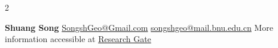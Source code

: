 \documentclass[lighthipster]{simplehipstercv}
\newlength{\rightcolwidth}
\begin{document}
\begin{paracol}{2}





\bigskip
\vfill{} %

\setlength{\parindent}{0pt}
\begin{minipage}[t]{\rightcolwidth}
\begin{center}\fontfamily{\sfdefault}\selectfont \color{black!70}
{\small \textbf{Shuang Song}  \href{mailto:SongshGeo@Gmail.com}{SongshGeo@Gmail.com}  \href{mailto:songshgeo@mail.bnu.edu.cn}{songshgeo@mail.bnu.edu.cn} \newline{} More information accessible at \href{https://www.researchgate.net/profile/Shuang-Song-14}{Research Gate}
}
\end{center}
\end{minipage}


\end{paracol}
\end{document}
